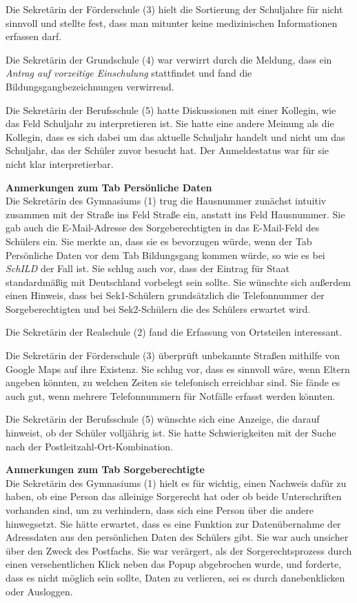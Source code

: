 Die Sekretärin der Förderschule (3) hielt die Sortierung der Schuljahre für nicht sinnvoll und stellte fest, dass man mitunter keine medizinischen Informationen erfassen darf.

Die Sekretärin der Grundschule (4) war verwirrt durch die Meldung, dass ein \textit{Antrag auf vorzeitige Einschulung} stattfindet und fand die Bildungsgangbezeichnungen verwirrend.

Die Sekretärin der Berufsschule (5) hatte Diskussionen mit einer Kollegin, wie das Feld \glqq Schuljahr\grqq{} zu interpretieren ist. Sie hatte eine andere Meinung als die Kollegin, dass es sich dabei um das aktuelle Schuljahr handelt und nicht um das Schuljahr, das der Schüler zuvor besucht hat. Der Anmeldestatus war für sie nicht klar interpretierbar.

\textbf{Anmerkungen zum Tab \glqq Persönliche Daten\grqq{}}\\
Die Sekretärin des Gymnasiums (1) trug die Hausnummer zunächst intuitiv zusammen mit der Straße ins Feld \glqq Straße\grqq{} ein, anstatt ins Feld \glqq Hausnummer\grqq{}. Sie gab auch die E-Mail-Adresse des Sorgeberechtigten in das E-Mail-Feld des Schülers ein. Sie merkte an, dass sie es bevorzugen würde, wenn der Tab \glqq Persönliche Daten\grqq{} vor dem Tab \glqq Bildungsgang\grqq{} kommen würde, so wie es bei \glqq  \textit{SchILD} \grqq{} der Fall ist. Sie schlug auch vor, dass der Eintrag für \glqq Staat\grqq{} standardmäßig mit \glqq Deutschland\grqq{} vorbelegt sein sollte. Sie wünschte sich außerdem einen Hinweis, dass bei Sek1-Schülern grundsätzlich die Telefonnummer der Sorgeberechtigten und bei Sek2-Schülern die des Schülers erwartet wird.

Die Sekretärin der Realschule (2) fand die Erfassung von Ortsteilen interessant.

Die Sekretärin der Förderschule (3) überprüft unbekannte Straßen mithilfe von Google Maps auf ihre Existenz. Sie schlug vor, dass es sinnvoll wäre, wenn Eltern angeben könnten, zu welchen Zeiten sie telefonisch erreichbar sind. Sie fände es auch gut, wenn mehrere Telefonnummern für Notfälle erfasst werden könnten.

Die Sekretärin der Berufsschule (5) wünschte sich eine Anzeige, die darauf hinweist, ob der Schüler volljährig ist. Sie hatte Schwierigkeiten mit der Suche nach der Postleitzahl-Ort-Kombination.

\textbf{Anmerkungen zum Tab \glqq Sorgeberechtigte\grqq{}}\\
Die Sekretärin des Gymnasiums (1) hielt es für wichtig, einen Nachweis dafür zu haben, ob eine Person das alleinige Sorgerecht hat oder ob beide Unterschriften vorhanden sind, um zu verhindern, dass sich eine Person über die andere hinwegsetzt. Sie hätte erwartet, dass es eine Funktion zur Datenübernahme der Adressdaten aus den persönlichen Daten des Schülers gibt. Sie war auch unsicher über den Zweck des Postfachs. Sie war verärgert, als der Sorgerechtsprozess durch einen versehentlichen Klick neben das Popup abgebrochen wurde, und forderte, dass es nicht möglich sein sollte, Daten zu verlieren, sei es durch danebenklicken oder Ausloggen.

